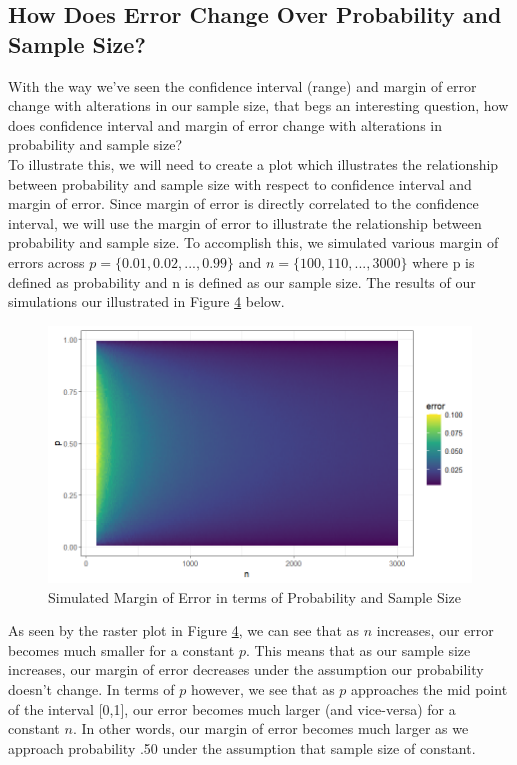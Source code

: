 \documentclass{article}\usepackage[]{graphicx}\usepackage[]{xcolor}
\begin{document}
\begin{multicols}{2}
\subsection{How Does Error Change Over Probability and Sample Size?}
With the way we've seen the confidence interval (range) and margin of error change with alterations in our sample size, that begs an interesting question, how does confidence interval and margin of error change with alterations in probability and sample size? \\
To illustrate this, we will need to create a plot which illustrates the relationship between probability and sample size with respect to confidence interval and margin of error. Since margin of error is directly correlated to the confidence interval, we will use the margin of error to illustrate the relationship between probability and sample size. To accomplish this, we simulated various margin of errors across $p = \{0.01, 0.02, ..., 0.99 \}$ and $n = \{100, 110, ..., 3000 \}$ where p is defined as probability and n is defined as our sample size. The results of our simulations our illustrated in Figure \hyperref[fig4]{4} below. 

\begin{figure}[H]
  \centering
  \includegraphics[width=\columnwidth]{Simulationraster.png}
  \caption{Simulated Margin of Error in terms of Probability and Sample Size}
  \label{fig4}
\end{figure}

As seen by the raster plot in Figure \hyperref[fig4]{4}, we can see that as $n$ increases, our error becomes much smaller for a constant $p$. This means that as our sample size increases, our margin of error decreases under the assumption our probability doesn't change. In terms of $p$ however, we see that as $p$ approaches the mid point of the interval [0,1], our error becomes much larger (and vice-versa) for a constant $n$. In other words, our margin of error becomes much larger as we approach probability .50 under the assumption that sample size of constant.


\end{multicols}
\end{document}
